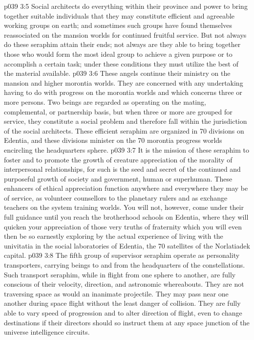 \vs p039 3:5 Social architects do everything within their province and power to bring together suitable individuals that they may constitute efficient and agreeable working groups on earth; and sometimes such groups have found themselves reassociated on the mansion worlds for continued fruitful service. But not always do these seraphim attain their ends; not always are they able to bring together those who would form the most ideal group to achieve a given purpose or to accomplish a certain task; under these conditions they must utilize the best of the material available.
\vs p039 3:6 These angels continue their ministry on the mansion and higher morontia worlds. They are concerned with any undertaking having to do with progress on the morontia worlds and which concerns three or more persons. Two beings are regarded as operating on the mating, complemental, or partnership basis, but when three or more are grouped for service, they constitute a social problem and therefore fall within the jurisdiction of the social architects. These efficient seraphim are organized in 70 divisions on Edentia, and these divisions minister on the 70 morontia progress worlds encircling the headquarters sphere.
\vs p039 3:7 \bibnobreakspace {} It is the mission of these seraphim to foster and to promote the growth of creature appreciation of the morality of interpersonal relationships, for such is the seed and secret of the continued and purposeful growth of society and government, human or superhuman. These enhancers of ethical appreciation function anywhere and everywhere they may be of service, as volunteer counsellors to the planetary rulers and as exchange teachers on the system training worlds. You will not, however, come under their full guidance until you reach the brotherhood schools on Edentia, where they will quicken your appreciation of those very truths of fraternity which you will even then be so earnestly exploring by the actual experience of living with the univitatia in the social laboratories of Edentia, the 70 satellites of the Norlatiadek capital.
\vs p039 3:8 \bibnobreakspace {} The fifth group of supervisor seraphim operate as personality transporters, carrying beings to and from the headquarters of the constellations. Such transport seraphim, while in flight from one sphere to another, are fully conscious of their velocity, direction, and astronomic whereabouts. They are not traversing space as would an inanimate projectile. They may pass near one another during space flight without the least danger of collision. They are fully able to vary speed of progression and to alter direction of flight, even to change destinations if their directors should so instruct them at any space junction of the universe intelligence circuits.
